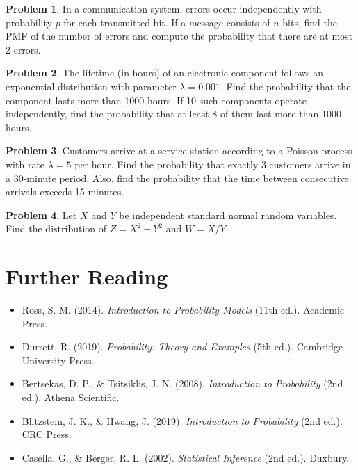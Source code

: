 \documentclass[12pt,a4paper]{article}
\theoremstyle{plain}
\theoremstyle{definition}
\newtheorem{problem}{Problem}[section]
\begin{document}
\begin{problem}
In a communication system, errors occur independently with probability $p$ for each transmitted bit. If a message consists of $n$ bits, find the PMF of the number of errors and compute the probability that there are at most 2 errors.
\end{problem}

\begin{problem}
The lifetime (in hours) of an electronic component follows an exponential distribution with parameter $\lambda = 0.001$. Find the probability that the component lasts more than 1000 hours. If 10 such components operate independently, find the probability that at least 8 of them last more than 1000 hours.
\end{problem}

\begin{problem}
Customers arrive at a service station according to a Poisson process with rate $\lambda = 5$ per hour. Find the probability that exactly 3 customers arrive in a 30-minute period. Also, find the probability that the time between consecutive arrivals exceeds 15 minutes.
\end{problem}

\begin{problem}
Let $X$ and $Y$ be independent standard normal random variables. Find the distribution of $Z = X^2 + Y^2$ and $W = X/Y$.
\end{problem}

\section{Further Reading}

\begin{itemize}
\item Ross, S. M. (2014). \textit{Introduction to Probability Models} (11th ed.). Academic Press.
\item Durrett, R. (2019). \textit{Probability: Theory and Examples} (5th ed.). Cambridge University Press.
\item Bertsekas, D. P., \& Tsitsiklis, J. N. (2008). \textit{Introduction to Probability} (2nd ed.). Athena Scientific.
\item Blitzstein, J. K., \& Hwang, J. (2019). \textit{Introduction to Probability} (2nd ed.). CRC Press.
\item Casella, G., \& Berger, R. L. (2002). \textit{Statistical Inference} (2nd ed.). Duxbury.
\end{itemize}
\end{document}
